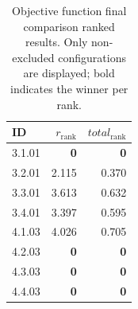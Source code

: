 \begin{table}[ht]
\centering
\footnotesize
\caption{Objective function final comparison ranked results. Only non-excluded configurations are displayed; bold indicates the winner per rank.}
\label{tab:final_obj_comparison_ranked}
\begin{tabular}{@{}lrr@{}}
\hline
    \textbf{ID} & \textbf{$r_{\text{rank}}$} & \textbf{$total_{\text{rank}}$} \\
\hline
    3.1.01 & \textbf{0} & \textbf{0} \\
    \noalign{\smallskip}
    3.2.01 & 2.115 & 0.370 \\
    \noalign{\smallskip}
    3.3.01 & 3.613 & 0.632 \\
    \noalign{\smallskip}
    3.4.01 & 3.397 & 0.595 \\
    \noalign{\smallskip}
    4.1.03 & 4.026 & 0.705 \\
    \noalign{\smallskip}
    4.2.03 & \textbf{0} & \textbf{0} \\
    \noalign{\smallskip}
    4.3.03 & \textbf{0} & \textbf{0} \\
    \noalign{\smallskip}
    4.4.03 & \textbf{0} & \textbf{0} \\
\hline
\end{tabular}
\end{table}
